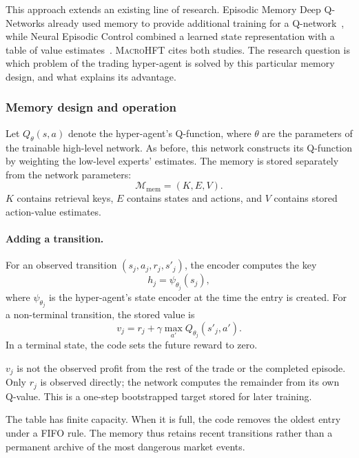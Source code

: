 \documentclass[9pt,a4paper,twocolumn]{extarticle}
\newcommand{\Macro}{\textsc{MacroHFT}}
\begin{document}
This approach extends an existing line of research. Episodic Memory Deep Q-Networks already used
memory to provide additional training for a Q-network~\cite{lin2018episodic}, while Neural
Episodic Control combined a learned state representation with a table of value
estimates~\cite{pritzel2017neural}. \Macro{} cites both studies. The research question is which
problem of the trading hyper-agent is solved by this particular memory design, and what explains
its advantage.

\subsubsection{Memory design and operation}

Let $Q_\theta(s,a)$ denote the hyper-agent's Q-function, where $\theta$ are the parameters of the
trainable high-level network. As before, this network constructs its Q-function by weighting the
low-level experts' estimates. The memory is stored separately from the network parameters:
\begin{equation}
  \mathcal M_{\mathrm{mem}}=(K,E,V).
  \label{eq:memory_structure}
\end{equation}
$K$ contains retrieval keys, $E$ contains states and actions, and $V$ contains stored action-value
estimates.

\paragraph{Adding a transition.}

For an observed transition $(s_j,a_j,r_j,s'_j)$, the encoder computes the key
\begin{equation}
  h_j=\psi_{\theta_j}(s_j),
  \label{eq:memory_key}
\end{equation}
where $\psi_{\theta_j}$ is the hyper-agent's state encoder at the time the entry is created. For a
non-terminal transition, the stored value is
\begin{equation}
  v_j
  =
  r_j+\gamma\max_{a'}Q_{\theta_j}(s'_j,a').
  \label{eq:memory_stored_value}
\end{equation}
In a terminal state, the code sets the future reward to zero.

$v_j$ is not the observed profit from the rest of the trade or the completed episode. Only $r_j$
is observed directly; the network computes the remainder from its own Q-value. This is a one-step
bootstrapped target stored for later training.

The table has finite capacity. When it is full, the code removes the oldest entry under a FIFO
rule. The memory thus retains recent transitions rather than a permanent archive of the most
dangerous market events.
\end{document}

